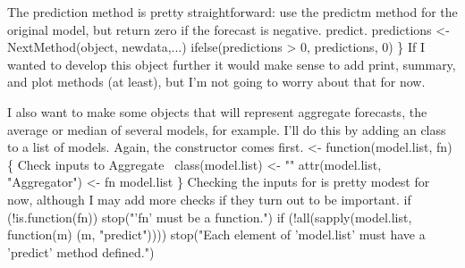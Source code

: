 \documentclass[10pt]{article}%
\begin{document}
The prediction method is pretty straightforward: use the {\Tt{}predictm\nwendquote}
method for the original model, 
but return zero if the forecast is negative.
\nwenddocs{}\plusendmoddef\nwstartdeflinemarkup{}\nwenddeflinemarkup
predict.
  predictions <- NextMethod(object, newdata,...)
  ifelse(predictions > 0, predictions, 0)
\}
\eatline
{}\nwendcode{}If I wanted to develop this object further it would make sense to add
print, summary, and plot methods (at least), but I'm not going to
worry about that for now.

I also want to make some objects that will represent aggregate
forecasts, the average or median of several models, for example.  I'll
do this by adding an {\Tt{}\nwendquote} class to a list of models.  Again,
the constructor comes first.
\nwenddocs{}\plusendmoddef\nwstartdeflinemarkup{}\nwenddeflinemarkup
{} <- function(model.list, fn) \{
  \LA{}Check inputs to \code{}Aggregate\edoc{}~{\nwtagstyle{}}\RA{}
  class(model.list) <- ""
  attr(model.list, "Aggregator") <- fn
  model.list
\}
\eatline
{}\nwendcode{}Checking the inputs for {\Tt{}\nwendquote} is pretty modest for now,
although I may add more checks if they turn out to be important.
\nwenddocs{}\endmoddef\nwstartdeflinemarkup{}\nwenddeflinemarkup
if (!is.function(fn)) stop("'fn' must be a function.")
if (!all(sapply(model.list, function(m) (m, "predict"))))
  stop("Each element of 'model.list' must have a 'predict' method defined.")
\nwendcode{}\nwdocspar
\end{document}
